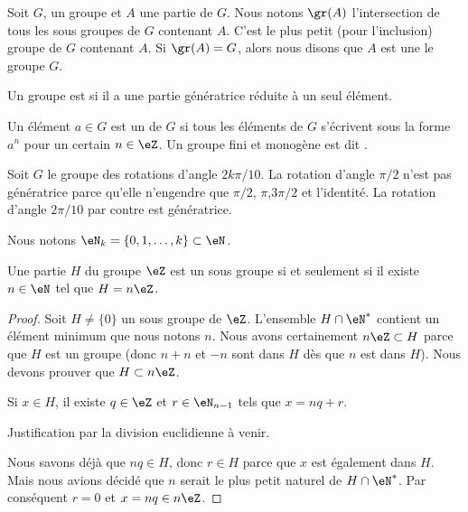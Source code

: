 \begin{definition}
    Soit \( G\), un groupe et \( A\) une partie de \( G\). Nous notons \( \gr(A)\) l'intersection de tous les sous groupes de \( G\) contenant \( A\). C'est le plus petit (pour l'inclusion) groupe de \( G\) contenant \( A\). Si \( \gr(A)=G\), alors nous disons que \( A\) est une  le groupe \( G\).

    Un groupe est  si il a une partie génératrice réduite à un seul élément.

    Un élément \( a\in G\) est un  de \( G\) si tous les éléments de \( G\) s'écrivent sous la forme \( a^n\) pour un certain \( n\in\eZ\). Un groupe fini et monogène est dit .
\end{definition}

\begin{example}
    Soit \( G\) le groupe des rotations d'angle \( 2k\pi/10\). La rotation d'angle \( \pi/2\) n'est pas génératrice parce qu'elle n'engendre que \( \pi/2\), \( \pi\),\( 3\pi/2\) et l'identité. La rotation d'angle \( 2\pi/10\) par contre est génératrice.
\end{example}


Nous notons \( \eN_{k}=\{ 0,1,\ldots, k \}\subset\eN\).
 
\begin{proposition} \label{PropSsgpZestnZ}
    Une partie \( H\) du groupe \( \eZ\) est un sous groupe si et seulement si il existe \( n\in\eN\) tel que \( H=n\eZ\).
\end{proposition}

\begin{proof}
    Soit \( H\neq\{ 0 \}\) un sous groupe de \( \eZ\). L'ensemble \( H\cap\eN^*\) contient un élément minimum que nous notons \( n\). Nous avons certainement \( n\eZ\subset H\) parce que \( H\) est un groupe (donc \( n+n\) et \( -n\) sont dans \( H\) dès que \( n\) est dans \( H\)). Nous devons prouver que \( H\subset n\eZ\).

    Si \( x\in H\), il existe \( q\in\eZ\) et \( r\in\eN_{n-1}\) tels que \( x=nq+r\).

    \begin{probleme}
        Justification par la division euclidienne à venir.
    \end{probleme}
    Nous savons déjà que \( nq\in H\), donc \( r\in H\) parce que \( x\) est également dans \( H\). Mais nous avions décidé que \( n\) serait le plus petit naturel de \( H\cap\eN^*\). Par conséquent \( r=0\) et \( x=nq\in n\eZ\).

\end{proof}

